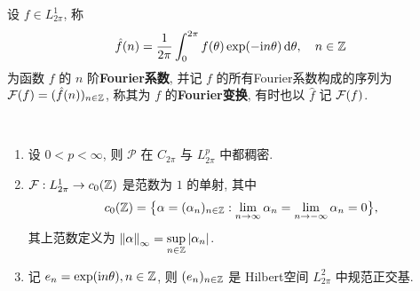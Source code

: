 	\begin{Definition}\label{def:Fourier系数, Fourier变换}
		设 $ f\in L_{2\pi}^{1} $, 称
		\[
			\hat{f}(n)=\frac{1}{2\pi}\int_{0}^{2\pi}f(\theta)\exp(-\mathrm{i} n\theta)\,\mathrm{d}\theta,\quad n\in\mathbb{Z}
		\]
		为函数  $ f $ 的 $ n $ 阶\textbf{Fourier系数}, 并记 $ f $ 的所有Fourier系数构成的序列为 $ \mathcal{F}(f)=(\hat{f}(n))_{n\in\mathbb{Z}} $, 称其为 $ f $ 的\textbf{Fourier变换}, 有时也以 $ \hat{f} $ 记 $ \mathcal{F}(f) $. 
	\end{Definition}
	\begin{Theorem}
		~
		\begin{enumerate}[(1)]
			\item 设 $ 0<p<\infty $, 则 $ \mathcal{P} $ 在 $ C_{2\pi} $ 与 $ L_{2\pi}^{p} $ 中都稠密.
			\item $ \mathcal{F} : L_{2\pi}^{1}\to c_{0}(\mathbb{Z}) $ 是范数为 $ 1 $ 的单射, 其中
			\[
				c_{0}(\mathbb{Z})=\big\{ \alpha = (\alpha_{n})_{n\in\mathbb{Z}}: \lim\limits_{n\to\infty}\alpha_{n}=\lim\limits_{n\to-\infty}\alpha_{n}=0 \big\},
			\]
			其上范数定义为 $ \left\| \alpha \right\|_{\infty}=\sup\limits_{n\in\mathbb{Z}}\left| \alpha_{n} \right|  $.
			\item 记 $ e_{n}=\exp(\mathrm{i} n\theta), n\in\mathbb{Z} $, 则 $ (e_{n})_{n\in\mathbb{Z}} $ 是 Hilbert空间 $ L_{2\pi}^{2} $ 中规范正交基.
		\end{enumerate}
	\end{Theorem}


